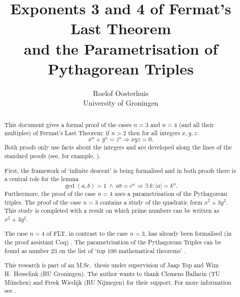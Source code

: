 \documentclass[11pt,a4paper,twoside]{article}
\begin{document}
\title{Exponents 3 and 4 of Fermat's Last Theorem \\ and the Parametrisation of Pythagorean Triples}
\author{Roelof Oosterhuis\\University of Groningen}
\maketitle

\begin{abstract}
This document gives a formal proof of the cases $n=3$ and $n=4$ (and
all their multiples) of Fermat's Last Theorem: if $n>2$ then for all
integers $x,y,z$:
\[ x^n + y^n = z^n \Longrightarrow xyz=0.\]
Both proofs only use facts about the integers and are developed along
the lines of the standard proofs (see, for example, \cite{Edwards}).

First, the framework of `infinite descent' is being formalised and in
both proofs there is a central role for the lemma
\[ \gcd(a,b)=1 ~\land~ ab=c^n \Longrightarrow \exists ~k: |a| =k^n. \]
Furthermore, the proof of the case $n=4$ uses a parametrisation of the
Pythagorean triples. The proof of the case $n=3$ contains a study of
the quadratic form $x^2 + 3y^2$. This study is completed with a result
on which prime numbers can be written as $x^2+3y^2$.

The case $n=4$ of FLT, in contrast to the case $n=3$, has already been
formalised (in the proof assistant Coq) \cite{DelahayeM}. The
parametrisation of the Pythagorean Triples can be found as number 23
on the list of `top 100 mathematical theorems' \cite{Wiedijk100}.

This research is part of an M.Sc.~thesis under supervision of Jaap Top
and Wim H.~Hesselink (RU Groningen). The author wants to thank Clemens
Ballarin (TU M\"unchen) and Freek Wiedijk (RU Nijmegen) for their
support. For more information see \cite{Oosterhuis-MSc}.
\end{abstract}
\thispagestyle{empty}
\clearpage

\tableofcontents
{}

\clearpage






\end{document}
